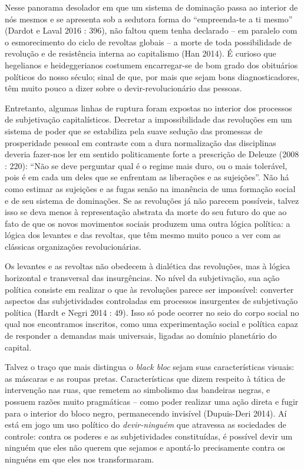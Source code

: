 Nesse panorama desolador em que um sistema de dominação passa ao
interior de nós mesmos e se apresenta sob a sedutora forma do
``empreenda-te a ti mesmo'' (Dardot e Laval 2016 : 396), não faltou quem
tenha declarado -- em paralelo com o esmorecimento do ciclo de revoltas
globais -- a morte de toda possibilidade de revolução e de resistência
interna ao capitalismo (Han 2014). É curioso que hegelianos e
heideggerianos costumem encarregar-se de bom grado dos obituários
políticos do nosso século; sinal de que, por mais que sejam bons
diagnosticadores, têm muito pouco a dizer sobre o devir-revolucionário
das pessoas.

Entretanto, algumas linhas de ruptura foram expostas no interior dos
processos de subjetivação capitalísticos. Decretar a impossibilidade das
revoluções em um sistema de poder que se estabiliza pela suave sedução
das promessas de prosperidade pessoal em contraste com a dura
normalização das disciplinas deveria fazer-nos ler em sentido
politicamente forte a prescrição de Deleuze (2008 : 220): ``Não se deve
perguntar qual é o regime mais duro, ou o mais tolerável, pois é em cada
um deles que se enfrentam as liberações e as sujeições''. Não há como
estimar as sujeições e as fugas senão na imanência de uma formação
social e de seu sistema de dominações. Se as revoluções já não parecem
possíveis, talvez isso se deva menos à representação abstrata da morte
do seu futuro do que ao fato de que os novos movimentos sociais produzem
uma outra lógica política: a lógica dos levantes e das revoltas, que têm
mesmo muito pouco a ver com as clássicas organizações revolucionárias.

Os levantes e as revoltas não obedecem à dialética das revoluções, mas à
lógica horizontal e transversal das insurgências. No nível da
subjetivação, sua ação política consiste em realizar o que às revoluções
parece ser impossível: converter aspectos das subjetividades controladas
em processos insurgentes de subjetivação política (Hardt e Negri 2014 :
49). Isso só pode ocorrer no seio do corpo social no qual nos
encontramos inscritos, como uma experimentação social e política capaz
de responder a demandas mais universais, ligadas ao domínio planetário
do capital.

Talvez o traço que mais distingua o \emph{black bloc} sejam suas
características visuais: as máscaras e as roupas pretas. Características
que dizem respeito à tática de intervenção nas ruas, que remetem ao
simbolismo das bandeiras negras, e possuem razões muito pragmáticas --
como poder realizar uma ação direta e fugir para o interior do bloco
negro, permanecendo invisível (Dupuis-Deri 2014). Aí está em jogo um uso
político do \emph{devir-ninguém }que atravessa as sociedades de
controle: contra os poderes e as subjetividades constituídas, é possível
devir um ninguém que eles não querem que sejamos e apontá-lo
precisamente contra os ninguéns em que eles nos transformaram.


